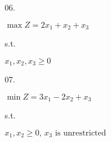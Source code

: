 \begin{frameExample}{06. }

  $\max Z = 2x_1 + x_2 + x_3$

  s.t.


  $x_1, x_2, x_3 \geq 0$

  
\end{frameExample}

\begin{frameExample}{07. }

  $\min Z = 3x_1 - 2x_2 + x_3$

  s.t.


  $x_1, x_2\geq 0, \, x_3 \text{  is unrestricted} $

  
\end{frameExample}


